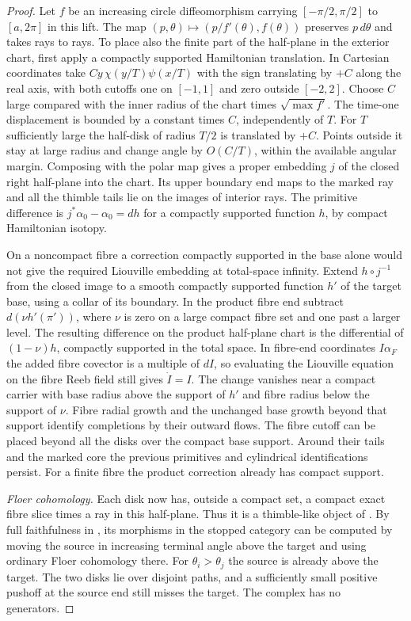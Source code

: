 \begin{proof}
Let $f$ be an increasing circle diffeomorphism carrying $[-\pi/2,\pi/2]$ to $[a,2\pi]$ in this lift. The map $(p,\theta)\mapsto(p/f'(\theta),f(\theta))$ preserves $p\,d\theta$ and takes rays to rays. To place also the finite part of the half-plane in the exterior chart, first apply a compactly supported Hamiltonian translation. In Cartesian coordinates take $Cy\,\chi(y/T)\psi(x/T)$ with the sign translating by $+C$ along the real axis, with both cutoffs one on $[-1,1]$ and zero outside $[-2,2]$. Choose $C$ large compared with the inner radius of the chart times $\sqrt{\max f'}$. The time-one displacement is bounded by a constant times $C$, independently of $T$. For $T$ sufficiently large the half-disk of radius $T/2$ is translated by $+C$. Points outside it stay at large radius and change angle by $O(C/T)$, within the available angular margin. Composing with the polar map gives a proper embedding $j$ of the closed right half-plane into the chart. Its upper boundary end maps to the marked ray and all the thimble tails lie on the images of interior rays. The primitive difference is $j^*\alpha_0-\alpha_0=dh$ for a compactly supported function $h$, by compact Hamiltonian isotopy.

On a noncompact fibre a correction compactly supported in the base alone would not give the required Liouville embedding at total-space infinity. Extend $h\circ j^{-1}$ from the closed image to a smooth compactly supported function $h'$ of the target base, using a collar of its boundary. In the product fibre end subtract $d(\nu h'(\pi'))$, where $\nu$ is zero on a large compact fibre set and one past a larger level. The resulting difference on the product half-plane chart is the differential of $(1-\nu)h$, compactly supported in the total space. In fibre-end coordinates $I\alpha_F$ the added fibre covector is a multiple of $dI$, so evaluating the Liouville equation on the fibre Reeb field still gives $\dot I=I$. The change vanishes near a compact carrier with base radius above the support of $h'$ and fibre radius below the support of $\nu$. Fibre radial growth and the unchanged base growth beyond that support identify completions by their outward flows. The fibre cutoff can be placed beyond all the disks over the compact base support. Around their tails and the marked core the previous primitives and cylindrical identifications persist. For a finite fibre the product correction already has compact support.

\medskip
\noindent\emph{Floer cohomology.}
Each disk now has, outside a compact set, a compact exact fibre slice times a ray in this half-plane. Thus it is a thimble-like object of \cite[Definition~8.19]{GPS}. By full faithfulness in \cite[Proposition~8.20]{GPS}, its morphisms in the stopped category can be computed by moving the source in increasing terminal angle above the target and using ordinary Floer cohomology there. For $\theta_i>\theta_j$ the source is already above the target. The two disks lie over disjoint paths, and a sufficiently small positive pushoff at the source end still misses the target. The complex has no generators.


\end{proof}
